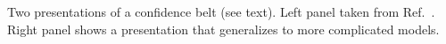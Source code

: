 Two presentations of a confidence belt (see text).  Left panel taken from Ref.~\cite{Feldman:1997qc}.  Right panel shows a presentation that generalizes to more complicated models.